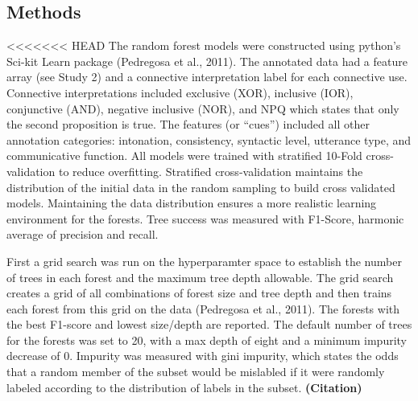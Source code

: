 \documentclass[,man,floatsintext]{apa6}
\begin{document}
\hypertarget{methods-2}{%
\subsection{Methods}\label{methods-2}}

<<<<<<< HEAD
The random forest models were constructed using python's Sci-kit Learn package (Pedregosa et al., 2011). The annotated data had a feature array (see Study 2) and a connective interpretation label for each connective use. Connective interpretations included exclusive (XOR), inclusive (IOR), conjunctive (AND), negative inclusive (NOR), and NPQ which states that only the second proposition is true. The features (or \enquote{cues}) included all other annotation categories: intonation, consistency, syntactic level, utterance type, and communicative function. All models were trained with stratified 10-Fold cross-validation to reduce overfitting. Stratified cross-validation maintains the distribution of the initial data in the random sampling to build cross validated models. Maintaining the data distribution ensures a more realistic learning environment for the forests. Tree success was measured with F1-Score, harmonic average of precision and recall.

First a grid search was run on the hyperparamter space to establish the number of trees in each forest and the maximum tree depth allowable. The grid search creates a grid of all combinations of forest size and tree depth and then trains each forest from this grid on the data (Pedregosa et al., 2011). The forests with the best F1-score and lowest size/depth are reported. The default number of trees for the forests was set to 20, with a max depth of eight and a minimum impurity decrease of 0. Impurity was measured with gini impurity, which states the odds that a random member of the subset would be mislabled if it were randomly labeled according to the distribution of labels in the subset. \textbf{(Citation)}
\end{document}
